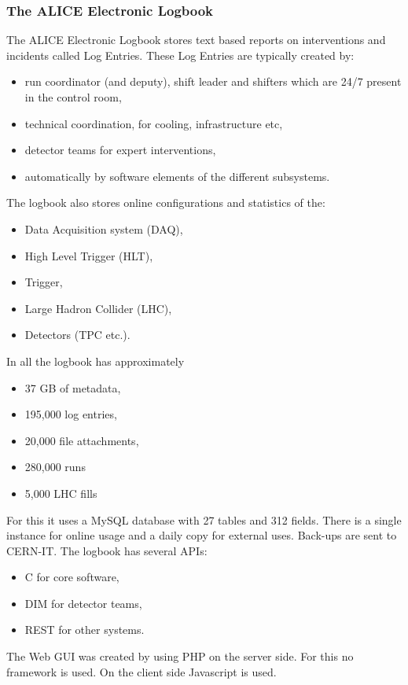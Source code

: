 \subsubsection{The ALICE Electronic Logbook}
The ALICE Electronic Logbook stores text based reports on interventions and incidents called Log Entries. These Log Entries are typically created by:
\begin{itemize}
  \item run coordinator (and deputy), shift leader and shifters which are 24/7 present in the control room,
  \item technical coordination, for cooling, infrastructure etc,
  \item detector teams for expert interventions,
  \item automatically by software elements of the different subsystems.
\end{itemize}

The logbook also stores online configurations and statistics of the:
\begin{itemize}
  \item Data Acquisition system (DAQ),
  \item High Level Trigger (HLT),
  \item Trigger,
  \item Large Hadron Collider (LHC),
  \item Detectors (TPC etc.).
\end{itemize}

In all the logbook has approximately
\begin{itemize}
  \item 37 GB of metadata,
  \item 195,000 log entries,
  \item 20,000 file attachments,
  \item 280,000 runs
  \item 5,000 LHC fills
\end{itemize}

For this it uses a MySQL database with 27 tables and 312 fields. There is a single instance for online usage and a daily copy for external uses. Back-ups are sent to CERN-IT. The logbook has several APIs:
\begin{itemize}
  \item C for core software,
  \item DIM for detector teams,
  \item REST for other systems.
\end{itemize}
The Web GUI was created by using PHP on the server side. For this no framework is used. On the client side Javascript is used.


